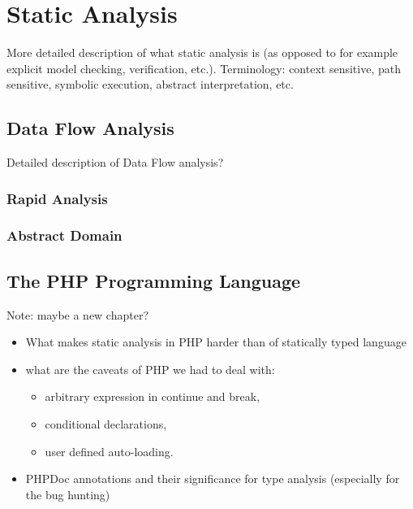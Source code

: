 \chapter{Static Analysis}

    More detailed description of what static analysis is 
    (as opposed to for example explicit model checking, 
    verification, etc.). Terminology: context sensitive, 
    path sensitive, symbolic execution, abstract interpretation, etc.
    
    \section{Data Flow Analysis}
    Detailed description of Data Flow analysis?    
   
    \subsection{Rapid Analysis}
    \subsection{Abstract Domain}

    \section{The PHP Programming Language}
    Note: maybe a new chapter?  
    \begin{itemize}
        \item[] What makes static analysis in PHP harder than of statically typed language
        \item[] what are the caveats of PHP we had to deal with:
            \begin{itemize}
                \item[] arbitrary expression in continue and break,
                \item[] conditional declarations,
                \item[] user defined auto-loading.
            \end{itemize}
        \item[] PHPDoc annotations and their significance for type analysis (especially for the bug hunting)        
    \end{itemize}